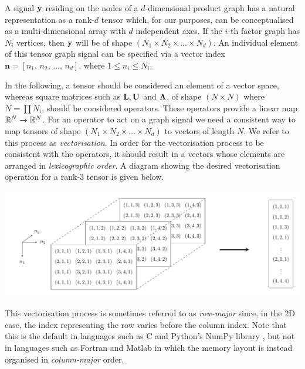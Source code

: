  {

A signal $\mathbf{y}$ residing on the nodes of a $d$-dimensional product graph has a natural representation as a rank-$d$ tensor which, for our purposes, can be conceptualised as a multi-dimensional array with $d$ independent axes. If the $i$-th factor graph has $N_i$ vertices, then $\mathbf{y}$ will be of shape $(N_1 \times N_2 \times ... \times N_d)$. An individual element of this tensor graph signal can be specified via a vector index $\mathbf{n} = [n_1,\, n_2,\, ...,\, n_d]$, where $1\leq n_i \leq N_i$. 

\vspace{0.5cm}

In the following, a tensor should be considered an element of a vector space, whereas square matrices such as $\mathbf{L}, \mathbf{U}$ and $\mathbf{\Lambda}$, of shape $(N \times N)$ where $N = \prod N_i$, should be considered operators. These operators provide a linear map $\mathbb{R}^{N} \rightarrow \mathbb{R}^{N}$. For an operator to act on a graph signal we need a consistent way to map tensors of shape $(N_1 \times N_2 \times ... \times N_d)$ to vectors of length $N$. We refer to this process as \textit{vectorisation}. In order for the vectorisation process to be consistent with the operators, it should result in a vectors whose elements are arranged in \textit{lexicographic order}. A diagram showing the desired vectorisation operation for a rank-3 tensor is given below. 

\vspace{0.5cm}

\includegraphics[width=\linewidth]{Figures/Tensor_Digaram.pdf}

\vspace{0.5cm}

This vectorisation process is sometimes referred to as \textit{row-major} since, in the 2D case, the index representing the row varies before the column index. Note that this is the default in languages such as C and Python's NumPy library \citep{harris2020}, but not in languages such as Fortran and Matlab in which the memory layout is instead organised in \textit{column-major} order. 

}
